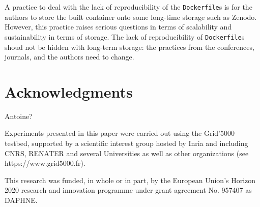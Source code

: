 \documentclass[sigconf,natbib=false]{acmart}
\newcommand{\df}{\texttt{Dockerfile}}
\begin{document}
A practice to deal with the lack of reproducibility of the \df s is for the authors to store the built container onto some long-time storage such as Zenodo.
However, this practice raises serious questions in terms of scalability and sustainability in terms of storage.
The lack of reproducibility of \df s shoud not be hidden with long-term storage: the practices from the conferences, journals, and the authors need to change.

%

\section*{Acknowledgments}

Antoine?

Experiments presented in this paper were carried out using the Grid'5000 testbed, supported by a scientific interest group hosted by Inria and including CNRS, RENATER and several Universities as well as other organizations (see https://www.grid5000.fr). 

This research was funded, in whole or in part, by the European Union’s Horizon 2020 research and innovation programme under grant agreement No. 957407 as DAPHNE.


\newpage
\newpage
%
%
\printbibliography
\end{document}
